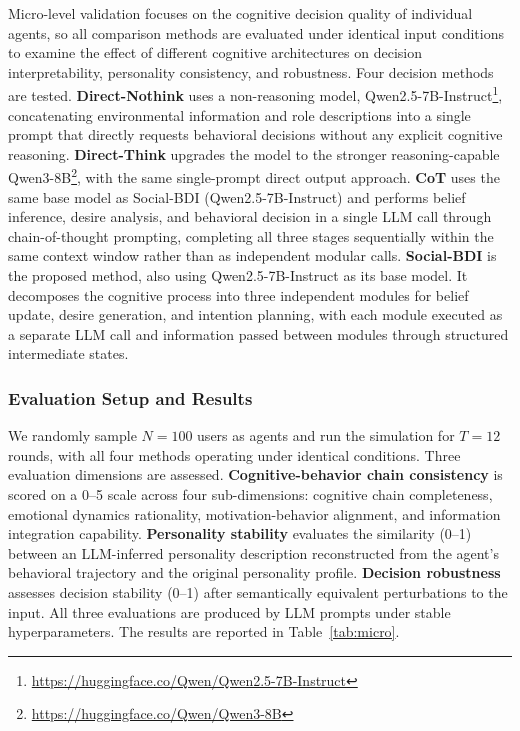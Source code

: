 \documentclass[a4paper,fleqn]{cas-dc}
\begin{document}
Micro-level validation focuses on the cognitive decision quality of individual agents, so all comparison methods are evaluated under identical input conditions to examine the effect of different cognitive architectures on decision interpretability, personality consistency, and robustness. Four decision methods are tested. \textbf{Direct-Nothink} uses a non-reasoning model, Qwen2.5-7B-Instruct\footnote{\url{https://huggingface.co/Qwen/Qwen2.5-7B-Instruct}}, concatenating environmental information and role descriptions into a single prompt that directly requests behavioral decisions without any explicit cognitive reasoning. \textbf{Direct-Think} upgrades the model to the stronger reasoning-capable Qwen3-8B\footnote{\url{https://huggingface.co/Qwen/Qwen3-8B}}, with the same single-prompt direct output approach. \textbf{CoT} uses the same base model as Social-BDI (Qwen2.5-7B-Instruct) and performs belief inference, desire analysis, and behavioral decision in a single LLM call through chain-of-thought prompting, completing all three stages sequentially within the same context window rather than as independent modular calls. \textbf{Social-BDI} is the proposed method, also using Qwen2.5-7B-Instruct as its base model. It decomposes the cognitive process into three independent modules for belief update, desire generation, and intention planning, with each module executed as a separate LLM call and information passed between modules through structured intermediate states.

\subsubsection{Evaluation Setup and Results}

We randomly sample $N=100$ users as agents and run the simulation for $T=12$ rounds, with all four methods operating under identical conditions. Three evaluation dimensions are assessed. \textbf{Cognitive-behavior chain consistency} is scored on a 0--5 scale across four sub-dimensions: cognitive chain completeness, emotional dynamics rationality, motivation-behavior alignment, and information integration capability. \textbf{Personality stability} evaluates the similarity (0--1) between an LLM-inferred personality description reconstructed from the agent's behavioral trajectory and the original personality profile. \textbf{Decision robustness} assesses decision stability (0--1) after semantically equivalent perturbations to the input. All three evaluations are produced by LLM prompts under stable hyperparameters. The results are reported in Table~\ref{tab:micro}.
\end{document}
